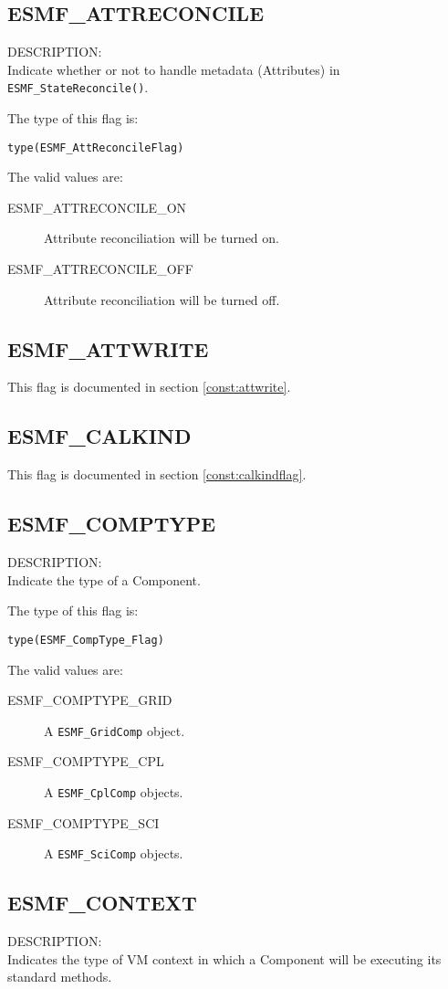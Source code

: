 \subsection{ESMF\_ATTRECONCILE}
\label{const:attreconcile}
{\sf DESCRIPTION:\\}
Indicate whether or not to handle metadata (Attributes) in {\tt ESMF\_StateReconcile()}.

The type of this flag is:

{\tt type(ESMF\_AttReconcileFlag)}

The valid values are:
\begin{description}
	\item[ESMF\_ATTRECONCILE\_ON]
	Attribute reconciliation will be turned on.
	\item[ESMF\_ATTRECONCILE\_OFF]
 	Attribute reconciliation will be turned off.
\end{description}


\subsection{ESMF\_ATTWRITE}
This flag is documented in section \ref{const:attwrite}.


\subsection{ESMF\_CALKIND}
This flag is documented in section \ref{const:calkindflag}.


\subsection{ESMF\_COMPTYPE}
\label{const:comptype}
{\sf DESCRIPTION:\\}
Indicate the type of a Component.

The type of this flag is:

{\tt type(ESMF\_CompType\_Flag)}

The valid values are:
\begin{description}
	\item[ESMF\_COMPTYPE\_GRID]
	A {\tt ESMF\_GridComp} object. 
	\item[ESMF\_COMPTYPE\_CPL]
	A {\tt ESMF\_CplComp} objects.
	\item[ESMF\_COMPTYPE\_SCI]
	A {\tt ESMF\_SciComp} objects.
\end{description}


\subsection{ESMF\_CONTEXT}
\label{const:contextflag}
{\sf DESCRIPTION:\\}  
Indicates the type of VM context in which a Component will be executing its
standard methods.

